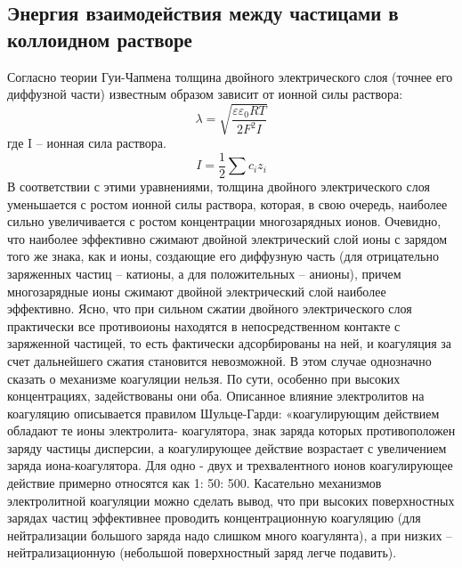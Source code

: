 \documentclass[a4paper, 12pt]{article}
\begin{document}
\subsection*{Энергия взаимодействия между частицами в коллоидном растворе}
Согласно теории Гуи-Чапмена толщина двойного электрического слоя (точнее его
диффузной части) известным образом зависит от ионной силы раствора:
\[\lambda=\sqrt{\frac{\varepsilon \varepsilon_0 RT}{2F^2I}}\]
где I – ионная сила раствора.
\[I=\frac{1}{2}\sum{c_iz_i}\]
В соответствии с этими уравнениями, толщина двойного электрического слоя
уменьшается с ростом ионной силы раствора, которая, в свою очередь, наиболее сильно
увеличивается с ростом концентрации многозарядных ионов. Очевидно, что наиболее
эффективно сжимают двойной электрический слой ионы с зарядом того же знака, как и
ионы, создающие его диффузную часть (для отрицательно заряженных частиц – катионы,
а для положительных – анионы), причем многозарядные ионы сжимают двойной
электрический слой наиболее эффективно. Ясно, что при сильном сжатии двойного
электрического слоя практически все противоионы находятся в непосредственном
контакте с заряженной частицей, то есть фактически адсорбированы на ней, и коагуляция
за счет дальнейшего сжатия становится невозможной. В этом случае однозначно сказать о
механизме коагуляции нельзя. По сути, особенно при высоких концентрациях,
задействованы они оба. Описанное влияние электролитов на коагуляцию описывается
правилом Шульце-Гарди: «коагулирующим действием обладают те ионы электролита-
коагулятора, знак заряда которых противоположен заряду частицы дисперсии, а
коагулирующее действие возрастает с увеличением заряда иона-коагулятора. Для одно -
двух и трехвалентного ионов коагулирующее действие примерно относятся как 1: 50: 500.
Касательно механизмов электролитной коагуляции можно сделать вывод, что при
высоких поверхностных зарядах частиц эффективнее проводить концентрационную
коагуляцию (для нейтрализации большого заряда надо слишком много коагулянта), а при
низких – нейтрализационную (небольшой поверхностный заряд легче подавить).\\
\end{document}
